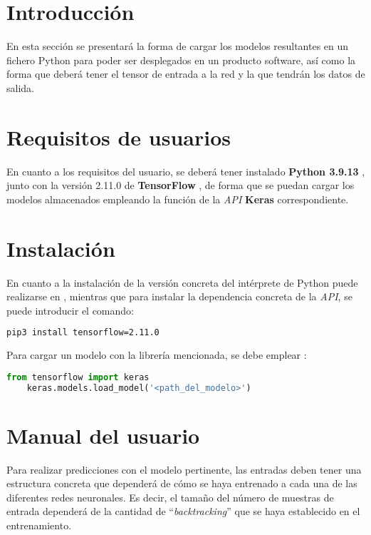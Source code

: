 
\section{Introducción}
En esta sección se presentará la forma de cargar los modelos resultantes en un fichero Python para poder ser desplegados en un producto software, 
así como la forma que deberá tener el tensor de entrada a la red y la que tendrán los datos de salida.

\section{Requisitos de usuarios}
En cuanto a los requisitos del usuario, se deberá tener instalado \textbf{Python 3.9.13} \cite{misc:python2023}, junto con la versión 2.11.0 de \textbf{TensorFlow} \cite{misc:tensorflow2023},
de forma que se puedan cargar los modelos almacenados empleando la función de la \textit{API} \textbf{Keras} correspondiente.

\section{Instalación}
En cuanto a la instalación de la versión concreta del intérprete de Python puede realizarse en \cite{misc:python2023}, mientras que para instalar la dependencia concreta de la \textit{API},
se puede introducir el comando:
\begin{lstlisting}[language=Bash]
    pip3 install tensorflow=2.11.0
\end{lstlisting}

Para cargar un modelo con la librería mencionada, se debe emplear \cite{misc:tensorflow_save2023}:
\begin{lstlisting}[language=Python]
    from tensorflow import keras
    keras.models.load_model('<path_del_modelo>')
\end{lstlisting}

\section{Manual del usuario}
Para realizar predicciones con el modelo pertinente, las entradas deben tener una estructura concreta que dependerá de cómo se haya entrenado a cada una de las diferentes redes neuronales.
Es decir, el tamaño del número de muestras de entrada dependerá de la cantidad de ``\textit{backtracking}'' que se haya establecido en el entrenamiento.

